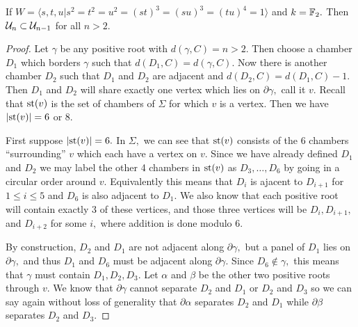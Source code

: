 \documentclass[class=book, crop=false]{standalone}
\begin{document}
\begin{theorem}
	\label{334f2fg}
	If $W=\langle s,t,u|s^2=t^2=u^2=(st)^3=(su)^3=(tu)^4=1\rangle$ and $k=\mathbb{F}_{2}.$ Then $\mathcal{U}_n\subset \mathcal{U}_{n-1}$ for all $n>2.$
\end{theorem}
\begin{proof}
	Let $\gamma$ be any positive root with $d(\gamma,C)=n>2.$ Then choose a chamber $D_1$ which borders $\gamma$ such that $d(D_1,C)=d(\gamma,C).$ Now there is another chamber $D_2$ such that $D_1$ and $D_2$ are adjacent and $d(D_2,C)=d(D_1,C)-1.$ Then $D_1$ and $D_2$ will share exactly one vertex which lies on $\partial \gamma,$ call it $v.$ Recall that $\mathrm{st}(v)$ is the set of chambers of $\Sigma$ for which $v$ is a vertex. Then we have $|\mathrm{st}(v)|=6$ or $8.$

	First suppose $|\mathrm{st}(v)|=6.$ In $\Sigma,$ we can see that $\mathrm{st}(v)$ consists of the 6 chambers ``surrounding'' $v$ which each have a vertex on $v.$ Since we have already defined $D_1$ and $D_2$ we may label the other 4 chambers in $\mathrm{st}(v)$ as $D_3,\dots,D_6$ by going in a circular order around $v.$ Equivalently this means that $D_i$ is ajacent to $D_{i+1}$ for $1\le i\le 5$ and $D_6$ is also adjacent to $D_1.$ We also know that each positive root will contain exactly 3 of these vertices, and those three vertices will be $D_i,D_{i+1},$ and $D_{i+2}$ for some $i,$ where addition is done modulo 6.

	By construction, $D_2$ and $D_1$ are not adjacent along $\partial \gamma,$ but a panel of $D_1$ lies on $\partial \gamma,$ and thus $D_1$ and $D_6$ must be adjacent along $\partial\gamma.$ Since $D_6\not\in \gamma,$ this means that $\gamma$ must contain $D_1,D_2,D_3.$ Let $\alpha$ and $\beta$ be the other two positive roots through $v.$ We know that $\partial\gamma$ cannot separate $D_2$ and $D_1$ or $D_2$ and $D_3$ so we can say again without loss of generality that $\partial\alpha$ separates $D_2$ and $D_1$ while $\partial\beta$ separates $D_2$ and $D_3.$ 


\end{proof}
\end{document}
